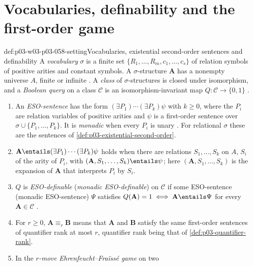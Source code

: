 \section{Vocabularies, definability and the first-order game}
\label{sec:p03-w03-p03-058-setting}

\begin{hbconvention}{def:p03-w03-p03-058-setting}{Vocabularies, existential second-order sentences and definability}
A \emph{vocabulary} \(\sigma\) is a finite set
\(\{R_1,\ldots,R_m,c_1,\ldots,c_s\}\) of relation symbols of positive
arities and constant symbols. A \(\sigma\)-structure \(\mathbf A\) has a
nonempty universe \(A\), finite or infinite
\cite[p.~3]{Kolaitis2003ExpressivePowerNotes}. A \emph{class} of
\(\sigma\)-structures is closed under isomorphism, and a \emph{Boolean
query} on a class \(\mathcal C\) is an isomorphism-invariant map
\(Q\colon\mathcal C\to\{0,1\}\) \cite[Def.~2.1, p.~4]{Kolaitis2003ExpressivePowerNotes}.
\begin{enumerate}
\item An \emph{ESO-sentence} has the form
      \((\exists P_1)\cdots(\exists P_k)\psi\) with \(k\ge0\), where the
      \(P_i\) are relation variables of positive arities and \(\psi\) is a
      first-order sentence over \(\sigma\cup\{P_1,\ldots,P_k\}\). It is
      \emph{monadic} when every \(P_i\) is unary
      \cite[p.~6]{Kolaitis2003ExpressivePowerNotes}. For relational
      \(\sigma\) these are the sentences of
      \cref{def:p03-existential-second-order}.
\item \(\mathbf A\entails(\exists P_1)\cdots(\exists P_k)\psi\) holds when
      there are relations \(S_1,\ldots,S_k\) on \(A\), \(S_i\) of the arity
      of \(P_i\), with
      \((\mathbf A,S_1,\ldots,S_k)\entails\psi\); here
      \((\mathbf A,S_1,\ldots,S_k)\) is the expansion of \(\mathbf A\) that
      interprets \(P_i\) by \(S_i\).
\item \(Q\) is \emph{ESO-definable} (\emph{monadic ESO-definable}) on
      \(\mathcal C\) if some ESO-sentence (monadic ESO-sentence) \(\Psi\)
      satisfies \(Q(\mathbf A)=1\iff\mathbf A\entails\Psi\) for every
      \(\mathbf A\in\mathcal C\) \cite[Def.~2.3, p.~5]{Kolaitis2003ExpressivePowerNotes}.
\item For \(r\ge0\), \(\mathbf A\equiv_r\mathbf B\) means that
      \(\mathbf A\) and \(\mathbf B\) satisfy the same first-order sentences
      of quantifier rank at most \(r\), quantifier rank being that of
      \cref{def:p03-quantifier-rank}.
\item In the \emph{\(r\)-move Ehrenfeucht--Fra\"iss\'e game} on two

\end{enumerate}
\end{hbconvention}
